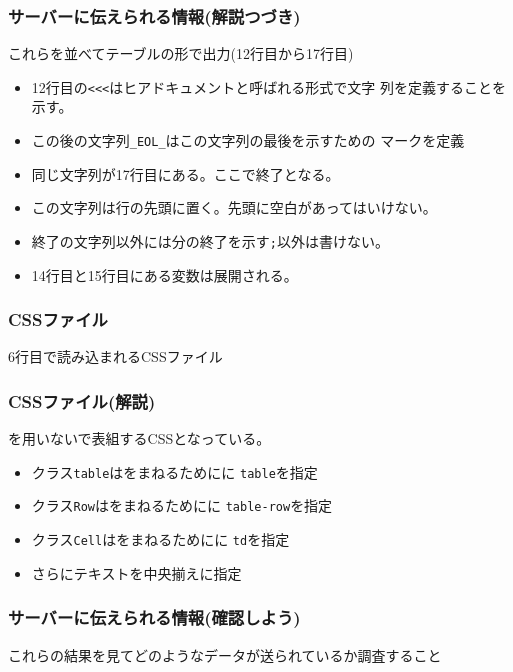 \begin{frame}[containsverbatim]
 \frametitle{サーバーに伝えられる情報(解説つづき)}
	これらを並べてテーブルの形で出力(12行目から17行目)
				\begin{itemize}
				 \item 12行目の\Verb+<<<+はヒアドキュメントと呼ばれる形式で文字
							 列を定義することを示す。
				 \item この後の文字列\Verb+_EOL_+はこの文字列の最後を示すための
							 マークを定義
				 \item 同じ文字列が17行目にある。ここで終了となる。
				 \item この文字列は行の先頭に置く。先頭に空白があってはいけない。
				 \item 終了の文字列以外には分の終了を示す\Verb+;+以外は書けない。
				 \item 14行目と15行目にある変数は展開される。
				\end{itemize}
\end{frame}
\begin{frame}[containsverbatim]
 \frametitle{CSSファイル}
 6行目で読み込まれるCSSファイル
\end{frame}

\begin{frame}[containsverbatim]
 \frametitle{CSSファイル(解説)}
 を用いないで表組するCSSとなっている。
 \begin{itemize}
	\item クラス\texttt{table}はをまねるためにに
				\texttt{table}を指定
	\item クラス\texttt{Row}はをまねるためにに
				\texttt{table-row}を指定
	\item クラス\texttt{Cell}はをまねるためにに
				\texttt{td}を指定
	\item さらにテキストを中央揃えに指定
 \end{itemize}
\end{frame}
\begin{frame}[containsverbatim]
 \frametitle{サーバーに伝えられる情報(確認しよう)}

 これらの結果を見てどのようなデータが送られているか調査すること
\end{frame}

\begin{frame}[containsverbatim]
 \frametitle{}
\end{frame}
